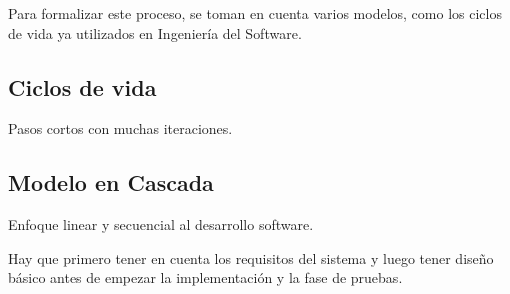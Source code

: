 \documentclass[12pt, twoside, openright]{report} %
\begin{document}
Para formalizar este proceso, se toman en cuenta varios modelos,
como los ciclos de vida ya utilizados en Ingeniería del Software.


\subsection{Ciclos de vida}
Pasos cortos con muchas iteraciones.

\subsection{Modelo en Cascada}


Enfoque linear y secuencial al desarrollo software.

Hay que primero tener en cuenta los requisitos del sistema y luego
tener diseño básico antes de empezar la implementación y la fase de
pruebas.
\end{document}
